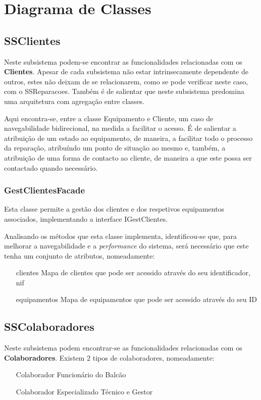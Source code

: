 \documentclass[a4paper,12pt]{scrreprt}
\begin{document}
\section{Diagrama de Classes} \label{sec:diagrama_classe}

\subsection{SSClientes} 
Neste subsistema podem-se encontrar as funcionalidades relacionadas com os \textbf{Clientes}. 
Apesar de cada subsistema não estar intrinsecamente dependente de outros, estes não deixam de 
se relacionarem, como se pode verificar neste caso, com o SSReparacoes. Também é de salientar que neste
subsistema predomina uma arquitetura com agregação entre classes.


Aqui encontra-se, entre a classe Equipamento e Cliente, um caso de navegabilidade bidirecional, 
na medida a facilitar o acesso. É de salientar a atribuição de um estado ao equipamento, de maneira, a facilitar todo o processo da reparação, 
atribuíndo um ponto de situação ao mesmo e, também, a atribuição de uma forma de contacto ao cliente, de maneira a que este possa ser contactado quando necessário.


\subsubsection{GestClientesFacade}
Esta classe permite a gestão dos clientes e dos respetivos equipamentos associados, implementando a interface IGestClientes.

Analisando os métodos que esta classe implementa, identificou-se que, para melhorar a navegabilidade
e a \textit{performance} do sistema, será necessário que este tenha um conjunto de atributos, nomeadamente:
\begin{itemize}
    \item[clientes]{Mapa de clientes que pode ser acessido através do seu identificador, nif}
    \item[equipamentos]{Mapa de equipamentos que pode ser acessido através do seu ID} 
\end{itemize}

\subsection{SSColaboradores}
Neste subsistema podem encontrar-se as funcionalidades relacionadas com os \textbf{Colaboradores}.
Existem 2 tipos de colaboradores, nomeadamente:
\begin{itemize}
    \item [Colaborador]{Funcionário do Balcão}
    \item [Colaborador Especializado] {Técnico e Gestor}
\end{itemize}
\end{document}
